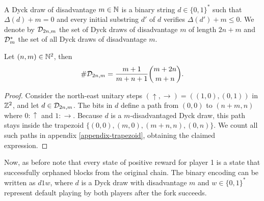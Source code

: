 \begin{mydef}
	A Dyck draw of disadvantage $m\in\mathbb{N}$ is a binary string $d\in\{0,1\}^\ast$ such that $\Delta(d)+m=0$ and every initial substring $d'$ of $d$ verifies $\Delta(d')+m\leq 0$. We denote by $\mathcal{D}_{2n,m}$ the set of Dyck draws of disadvantage $m$ of length $2n+m$ and $\mathcal{D}^\ast_{m}$ the set of all Dyck draws of disadvantage $m$.
\end{mydef}

\begin{myprop*}
	\label{prop-trapezoidcardinality}
	Let $(n,m)\in \mathbb{N}^2$, then 
	$$\#\mathcal{D}_{2n,m}=\frac{m+1}{m+n+1}{m+2n\choose m+n}.$$
\end{myprop*}
\begin{proof}
Consider the north-east unitary steps $(\uparrow,\rightarrow)=((1,0),(0,1))$ in $\mathbb{Z}^2$, and let $d\in \mathcal{D}_{2n,m}$. The bits in $d$ define a path from $(0,0)$ to $(n+m,n)$ where $0:\uparrow$ and $1:\rightarrow$. Because $d$ is a $m$-disadvantaged Dyck draw, this path stays inside the trapezoid $\{(0,0),(m,0),(m+n,n),(0,n)\}$. We count all such paths in appendix \ref{appendix-trapezoid}, obtaining the claimed expression.
\end{proof}
Now, as before note that every state of positive reward for player 1 is a state that successfully orphaned blocks from the original chain. The binary encoding can be written as $d1w$, where $d$ is a Dyck draw with disadvantage $m$ and $w\in\{0,1\}^\ast$ represent default playing by both players after the fork succeeds. 

